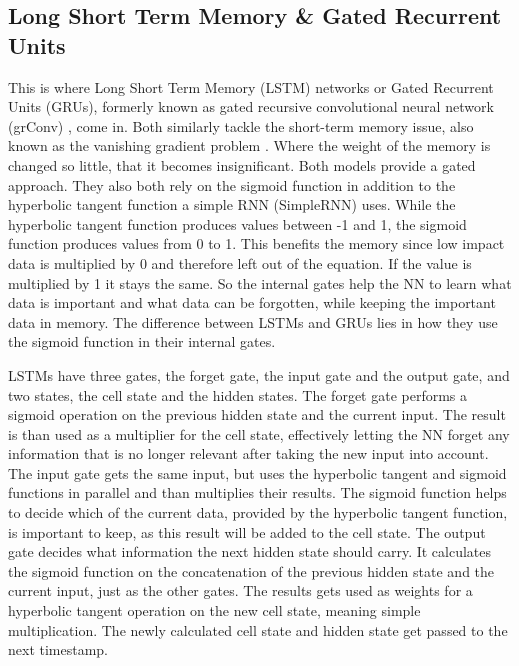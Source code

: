 \documentclass[
	ngerman,
	ruledheaders=section,%
	class=report,%
	thesis={type=bachelor},%
	accentcolor=9c,%
	custommargins=true,%
	marginpar=false,%
	parskip=half-,%
	fontsize=11pt,%
]{tudapub}
\begin{document}
\subsection{Long Short Term Memory \& Gated Recurrent Units}
\label{sec:LSTMandGRU}

This is where Long Short Term Memory (LSTM) networks \cite{hochreiterLongShortTermMemory1997} or Gated Recurrent Units (GRUs), formerly known as gated recursive convolutional neural network (grConv) \cite{bahdanauNeuralMachineTranslation2016}, come in.
Both similarly tackle the short-term memory issue,
also known as the vanishing gradient problem \cite{hochreiterLongShortTermMemory1997}.
Where the weight of the memory is changed so little, that it becomes insignificant.
Both models provide a gated approach.
They also both rely on the sigmoid function in addition to the hyperbolic tangent function a simple RNN (SimpleRNN) uses.
While the hyperbolic tangent function produces values between -1 and 1,
the sigmoid function produces values from 0 to 1.
This benefits the memory since low impact data is multiplied by 0 and therefore left out of the equation.
If the value is multiplied by 1 it stays the same.
So the internal gates help the NN to learn what data is important and what data can be forgotten, while keeping the important data in memory.
The difference between LSTMs and GRUs lies in how they use the sigmoid function in their internal gates.

LSTMs have three gates, the forget gate, the input gate and the output gate, and two states, the cell state and the hidden states. \cite{phiIllustratedGuideLSTM2020}
The forget gate performs a sigmoid operation on the previous hidden state and the current input.
The result is than used as a multiplier for the cell state, effectively letting the NN forget any information that is no longer relevant after taking the new input into account.
The input gate gets the same input, but uses the hyperbolic tangent and sigmoid functions in parallel and than multiplies their results.
The sigmoid function helps to decide which of the current data, provided by the hyperbolic tangent function, is important to keep, as this result will be added to the cell state.
The output gate decides what information the next hidden state should carry.
It calculates the sigmoid function on the concatenation of the previous hidden state and the current input, just as the other gates.
The results gets used as weights for a hyperbolic tangent operation on the new cell state, meaning simple multiplication.
The newly calculated cell state and hidden state get passed to the next timestamp.
\end{document}
